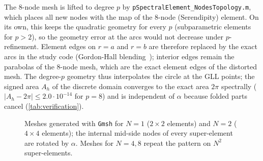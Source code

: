 The 8-node mesh is lifted to degree $p$ by \texttt{pSpectralElement\_NodesTopology.m}, which
places all new nodes with the map of the 8-node (Serendipity) element. On its own, this keeps
the quadratic geometry for every $p$ (subparametric elements for $p>2$), so the geometry error
at the arcs would not decrease under $p$-refinement. Element edges on $r=a$ and $r=b$ are
therefore replaced by the exact arcs in the study code (Gordon-Hall
blending~\cite{Gordon1973Transfinite}); interior edges remain the parabolas of the
8-node mesh, which are the exact element edges of the distorted mesh. The degree-$p$ geometry
thus interpolates the circle at the GLL points;
the signed area $A_h$ of the discrete domain converges to the exact area $2\pi$ spectrally ($|A_h-2\pi|\le2.0\cdot10^{-14}$ for $p=8$) and is
independent of $\alpha$ because folded parts cancel (\cref{tab:verification}).

\begin{figure}[t]
  \centering
  
  \caption{Meshes generated with \texttt{Gmsh} for $N=1$ ($2\times2$ elements) and $N=2$ ($4\times4$
    elements); the internal mid-side nodes of every super-element are rotated by $\alpha$.
    Meshes for $N=4,8$ repeat the pattern on $N^2$ super-elements.}
  \label{fig:meshes}
\end{figure}

